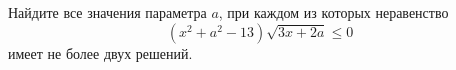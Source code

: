 \begin{ex}
	\begin{condition}
		Найдите все значения параметра \( a \), при каждом из которых неравенство \[ (x^2+a^2-13)\sqrt{3x+2a}\le0 \] имеет не более двух решений.
	\end{condition}
	\answer{\( (-\infty;-3]\cup[\sqrt{13};+\infty) \)}
\end{ex}